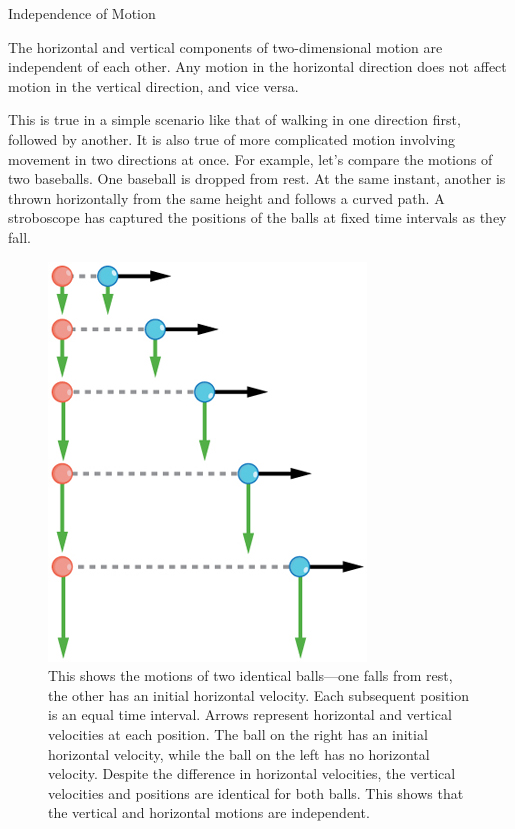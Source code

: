 \documentclass[
]{book}
\newenvironment{note}{}{}
\begin{document}
\hypertarget{fs-id1165298714031}{}
\begin{note}

Independence of Motion

The horizontal and vertical components of two-dimensional motion are
independent of each other. Any motion in the horizontal direction does
not affect motion in the vertical direction, and vice versa.

\end{note}

This is true in a simple scenario like that of walking in one direction
first, followed by another. It is also true of more complicated motion
involving movement in two directions at once. For example, let's
compare the motions of two baseballs. One baseball is dropped from rest.
At the same instant, another is thrown horizontally from the same height
and follows a curved path. A stroboscope has captured the positions of
the balls at fixed time intervals as they fall.

\begin{figure}
\hypertarget{import-auto-id1165296248287}{%
\centering
\includegraphics{images/Figure_03_01_04a.jpg}
\caption{This shows the motions of two identical balls---one falls from rest,
the other has an initial horizontal velocity. Each subsequent position
is an equal time interval. Arrows represent horizontal and vertical
velocities at each position. The ball on the right has an initial
horizontal velocity, while the ball on the left has no horizontal
velocity. Despite the difference in horizontal velocities, the vertical
velocities and positions are identical for both balls. This shows that
the vertical and horizontal motions are
independent.}\label{import-auto-id1165296248287}
}
\end{figure}
\end{document}
